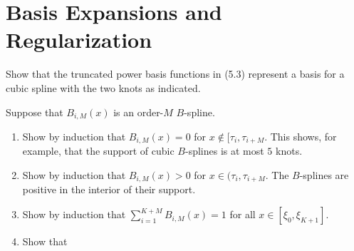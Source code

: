 \chapter{Basis Expansions and Regularization}

\begin{exer}
    Show that the truncated power basis functions in (5.3) represent a basis for a cubic spline with the two knots as indicated.
\end{exer}

\begin{exer}
Suppose that $B_{i, M}(x)$ is an order-$M$ $B$-spline.  
    \begin{enumerate}
        \item Show by induction that $B_{i, M}(x) = 0$ for $x \notin [\tau _i, \tau_{i+M}$.  This shows, for example, that the support of cubic $B$-splines is at most $5$ knots.
        \item Show by induction that $B_{i, M}(x) > 0$ for $x \in (\tau_i, \tau_{i + M }$.  The $B$-splines are positive in the interior of their support. 
        \item Show by induction that $\sum_{i=1}^{K+M} B_{i, M}(x) = 1$ for all $x \in [\xi_0, \xi_{K+1}]$.
        \item Show that 

    \end{enumerate}
\end{exer}

\begin{exer}
        
\end{exer}
